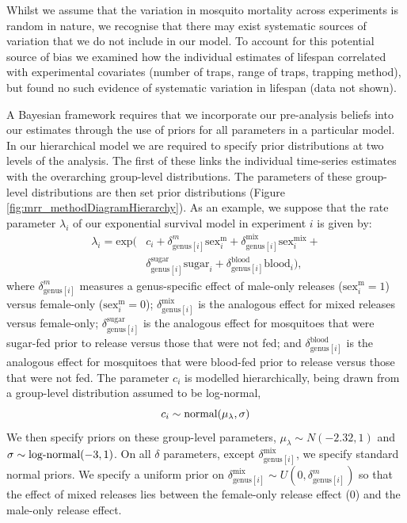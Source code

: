 \documentclass[12pt]{article}
\begin{document}
Whilst we assume that the variation in mosquito mortality across experiments is random in nature, we recognise that there may exist systematic sources of variation that we do not include in our model. To account for this potential source of bias we examined how the individual estimates of lifespan correlated with experimental covariates (number of traps, range of traps, trapping method), but found no such evidence of systematic variation in lifespan (data not shown).

A Bayesian framework requires that we incorporate our pre-analysis beliefs into our estimates through the use of priors for all parameters in a particular model. In our hierarchical model we are required to specify prior distributions at two levels of the analysis. The first of these links the individual time-series estimates with the overarching group-level distributions. The parameters of these group-level distributions are then set prior distributions (Figure \ref{fig:mrr_methodDiagramHierarchy}). As an example, we suppose that the rate parameter $\lambda_i$ of our exponential survival model in experiment $i$ is given by:
%
\begin{align}
\lambda_i = \text{exp}(&c_i + \delta^m_{\text{genus}[i]} \text{sex}^{\text{m}}_i + \delta^{\text{mix}}_{\text{genus}[i]} \text{sex}^{\text{mix}}_i +\\  & \delta^{\text{sugar}}_{\text{genus}[i]} \text{sugar}_i +  \delta^{\text{blood}}_{\text{genus}[i]} \text{blood}_i),
\end{align}
%
where $\delta^m_{\text{genus}[i]}$ measures a genus-specific effect of male-only releases ($\text{sex}^{\text{m}}_i=1$) versus female-only ($\text{sex}^{\text{m}}_i=0$); $\delta^{\text{mix}}_{\text{genus}[i]}$ is the analogous effect for mixed releases versus female-only; $\delta^{\text{sugar}}_{\text{genus}[i]}$ is the analogous effect for mosquitoes that were sugar-fed prior to release versus those that were not fed; and $\delta^{\text{blood}}_{\text{genus}[i]}$ is the analogous effect for mosquitoes that were blood-fed prior to release versus those that were not fed. The parameter $c_i$ is modelled hierarchically, being drawn from a group-level distribution assumed to be log-normal,
%
\begin{equation}
c_i \sim  \textnormal{normal}(\mu_\lambda,\sigma)
\end{equation}
%
We then specify priors on these group-level parameters, $\mu_\lambda \sim N(-2.32,1)$ and $\sigma \sim \textnormal{log-normal}(-3,1)$. On all $\delta$ parameters, except $\delta^{\text{mix}}_{\text{genus}[i]}$, we specify standard normal priors. We specify a uniform prior on $\delta^{\text{mix}}_{\text{genus}[i]}\sim U(0,\delta^m_{\text{genus}[i]})$ so that the effect of mixed releases lies between the female-only release effect (0) and the male-only release effect. 
\end{document}
